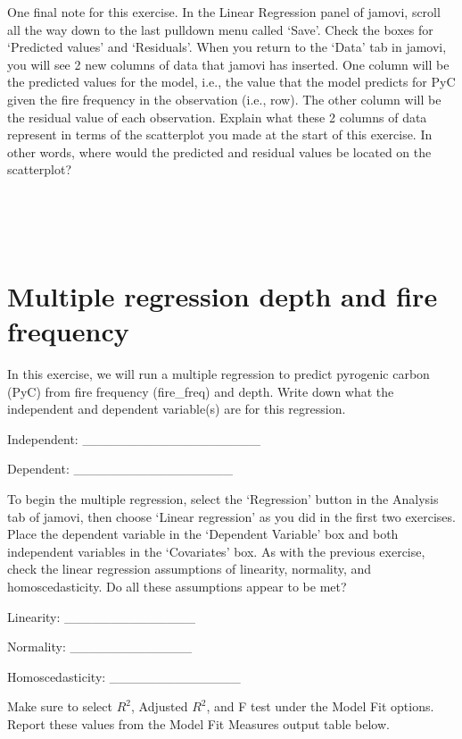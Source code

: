 \documentclass[
  openany]{krantz}
\begin{document}
One final note for this exercise.
In the Linear Regression panel of jamovi, scroll all the way down to the last pulldown menu called `Save'.
Check the boxes for `Predicted values' and `Residuals'.
When you return to the `Data' tab in jamovi, you will see 2 new columns of data that jamovi has inserted.
One column will be the predicted values for the model, i.e., the value that the model predicts for PyC given the fire frequency in the observation (i.e., row).
The other column will be the residual value of each observation.
Explain what these 2 columns of data represent in terms of the scatterplot you made at the start of this exercise.
In other words, where would the predicted and residual values be located on the scatterplot?

\begin{verbatim}




\end{verbatim}

\hypertarget{multiple-regression-depth-and-fire-frequency}{%
\section{Multiple regression depth and fire frequency}\label{multiple-regression-depth-and-fire-frequency}}

In this exercise, we will run a multiple regression to predict pyrogenic carbon (PyC) from fire frequency (fire\_freq) and depth.
Write down what the independent and dependent variable(s) are for this regression.

Independent: \_\_\_\_\_\_\_\_\_\_\_\_\_\_\_\_\_\_\_

Dependent: \_\_\_\_\_\_\_\_\_\_\_\_\_\_\_\_\_

To begin the multiple regression, select the `Regression' button in the Analysis tab of jamovi, then choose `Linear regression' as you did in the first two exercises.
Place the dependent variable in the `Dependent Variable' box and both independent variables in the `Covariates' box.
As with the previous exercise, check the linear regression assumptions of linearity, normality, and homoscedasticity.
Do all these assumptions appear to be met?

Linearity: \_\_\_\_\_\_\_\_\_\_\_\_\_\_

Normality: \_\_\_\_\_\_\_\_\_\_\_\_\_

Homoscedasticity: \_\_\_\_\_\_\_\_\_\_\_\_\_\_

Make sure to select \(R^{2}\), Adjusted \(R^{2}\), and F test under the Model Fit options.
Report these values from the Model Fit Measures output table below.
\end{document}
